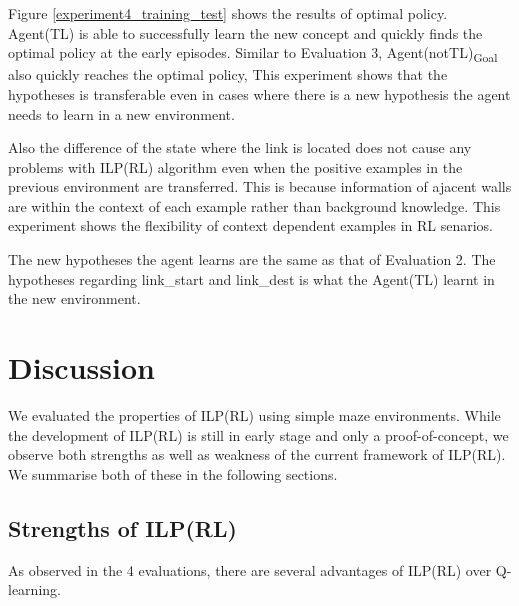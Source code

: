 Figure \ref{experiment4_training_test} shows the results of optimal policy. 
Agent(TL) is able to successfully learn the new concept and quickly finds the optimal policy at the early episodes. Similar to Evaluation 3, Agent(notTL)\textsubscript{Goal} also quickly reaches the optimal policy,  
This experiment shows that the hypotheses is transferable even in cases where there is a new hypothesis the agent needs to learn in a new environment.

Also the difference of the state where the link is located does not cause any problems with ILP(RL) algorithm even when the positive examples in the previous environment are transferred. This is because information of ajacent walls are within the context of each example rather than background knowledge. This experiment shows the flexibility of context dependent examples in RL senarios.

The new hypotheses the agent learns are the same as that of Evaluation 2. The hypotheses regarding \textsf{link\_start} and \textsf{link\_dest} is what the Agent(TL) learnt in the new environment.

\section{Discussion}
\label{sec:discussion}

We evaluated the properties of ILP(RL) using simple maze environments. While the development of ILP(RL) is still in early stage and only a proof-of-concept, we observe both strengths as well as weakness of the current framework of ILP(RL). We summarise both of these in the following sections.

\subsection{Strengths of ILP(RL)}
As observed in the 4 evaluations, there are several advantages of ILP(RL) over Q-learning.


